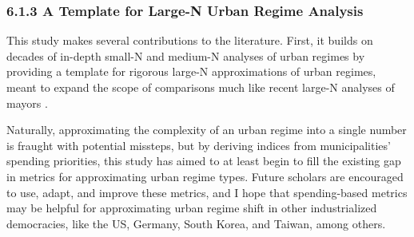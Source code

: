\documentclass[preprint, 3p,
authoryear]{elsarticle} %
\begin{document}
\hypertarget{a-template-for-large-n-urban-regime-analysis}{%
\subsubsection{6.1.3 A Template for Large-N Urban Regime
Analysis}\label{a-template-for-large-n-urban-regime-analysis}}

This study makes several contributions to the literature. First, it
builds on decades of in-depth small-N
\citep{munoz_and_henry_1986, stone_1989, whelan_et_al_1994, yeum_2002, gendron_and_domhoff_2018}
and medium-N analyses of urban regimes
\citep{kilburn_2004, thompson_2005, de_socio_2007} by providing a
template for rigorous large-N approximations of urban regimes, meant to
expand the scope of comparisons much like recent large-N analyses of
mayors
\citep{ramirez_perez_et_al_2008, debenedictis_kessner_and_warshaw_2016, einstein_and_glick_2018, murphy_2019}.

Naturally, approximating the complexity of an urban regime into a single
number is fraught with potential missteps, but by deriving indices from
municipalities' spending priorities, this study has aimed to at least
begin to fill the existing gap in metrics for approximating urban regime
types. Future scholars are encouraged to use, adapt, and improve these
metrics, and I hope that spending-based metrics may be helpful for
approximating urban regime shift in other industrialized democracies,
like the US, Germany, South Korea, and Taiwan, among others.

\singlespacing

\renewcommand{\baselinestretch}{0.5}\selectfont
\renewcommand{\arraystretch}{1.5}

\begingroup\fontsize{9}{11}\selectfont
\end{document}
